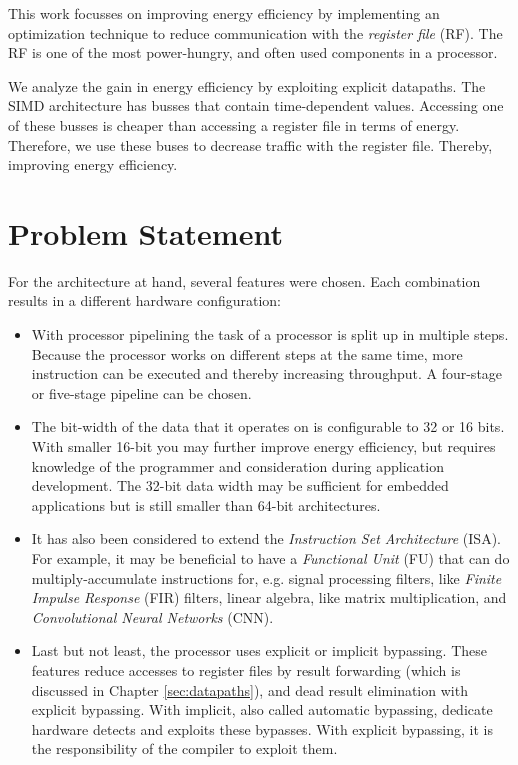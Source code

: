 This work focusses on improving energy efficiency by implementing an optimization technique to reduce communication with the \emph{register file} (RF). The RF is one of the most power-hungry, and often used components in a processor. 

We analyze the gain in energy efficiency by exploiting explicit datapaths. The SIMD architecture has busses that contain time-dependent values. Accessing one of these busses is cheaper than accessing a register file in terms of energy. Therefore, we use these buses to decrease traffic with the register file. Thereby, improving energy efficiency. 


\section{Problem Statement}
For the architecture at hand, several features were chosen. Each combination results in a different hardware configuration:
\begin{itemize}
\item With processor pipelining the task of a processor is split up in multiple steps. Because the processor works on different steps at the same time, more instruction can be executed and thereby increasing throughput. A four-stage or five-stage pipeline can be chosen. %
\item	The bit-width of the data that it operates on is configurable to 32 or 16 bits. With smaller 16-bit you may further improve energy efficiency, but requires knowledge of the programmer and consideration during application development. The 32-bit data width may be sufficient for embedded applications but is still smaller than 64-bit architectures.
\item	It has also been considered to extend the \emph{Instruction Set Architecture} (ISA). For example, it may be beneficial to have a  \emph{Functional Unit} (FU) that can do multiply-accumulate instructions for, e.g. signal processing filters, like \emph{Finite Impulse Response} (FIR) filters, linear algebra, like matrix multiplication, and \emph{Convolutional Neural Networks} (CNN). %
\item Last but not least, the processor uses explicit or implicit bypassing. These features reduce accesses to register files by result forwarding (which is discussed in Chapter \ref{sec:datapaths}), and dead result elimination with explicit bypassing. With implicit, also called automatic bypassing, dedicate hardware detects and exploits these bypasses. With explicit bypassing, it is the responsibility of the compiler to exploit them.
\end{itemize}

